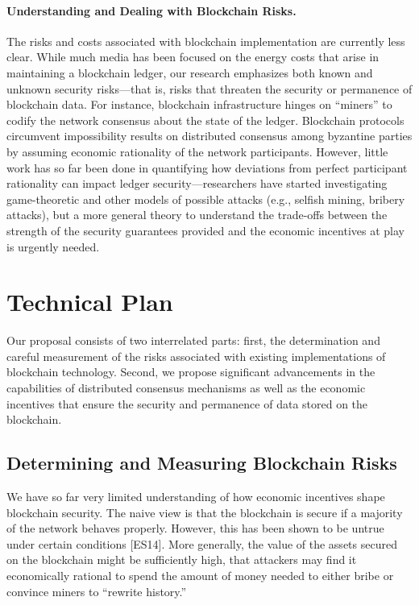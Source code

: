 \documentclass[runningheads, 12pt]{article}
\begin{document}
\vspace{-5pt}
\paragraph{Understanding and Dealing with Blockchain Risks.} The risks and costs associated with blockchain implementation are currently less clear. While much media has been focused on the energy costs that arise in maintaining a blockchain ledger, our research emphasizes both known and unknown security risks---that is, risks that threaten the security or permanence of blockchain data. For instance, blockchain infrastructure hinges on “miners” to codify the network consensus about the state of the ledger. Blockchain protocols circumvent impossibility results on distributed consensus among byzantine parties by assuming economic rationality of the network participants. However, little work has so far been done in quantifying how deviations from perfect participant rationality can impact ledger security---researchers have started investigating game-theoretic and other models of possible attacks (e.g., selfish mining, bribery attacks), but a more general theory to understand the trade-offs between the strength of the security guarantees provided and the economic incentives at play is urgently needed.


\vspace{-5pt}
\section{Technical Plan}
\vspace{-4pt}

Our proposal consists of two interrelated parts: first, the determination and careful measurement of the risks associated with existing implementations of blockchain technology. Second, we propose significant advancements in the capabilities of distributed consensus mechanisms as well as the economic incentives that ensure the security and permanence of data stored on the blockchain.

\vspace{-4pt}
\subsection{Determining and Measuring Blockchain Risks}
\vspace{-3pt}

We have so far very limited understanding of how economic incentives shape blockchain security. The naive view is that the blockchain is secure if a majority of the network behaves properly. However, this has been shown to be untrue under certain conditions [ES14]. More generally, the value of the assets secured on the blockchain might be sufficiently high, that attackers may find it economically rational to spend the amount of money needed to either bribe or convince miners to “rewrite history.”
\end{document}
